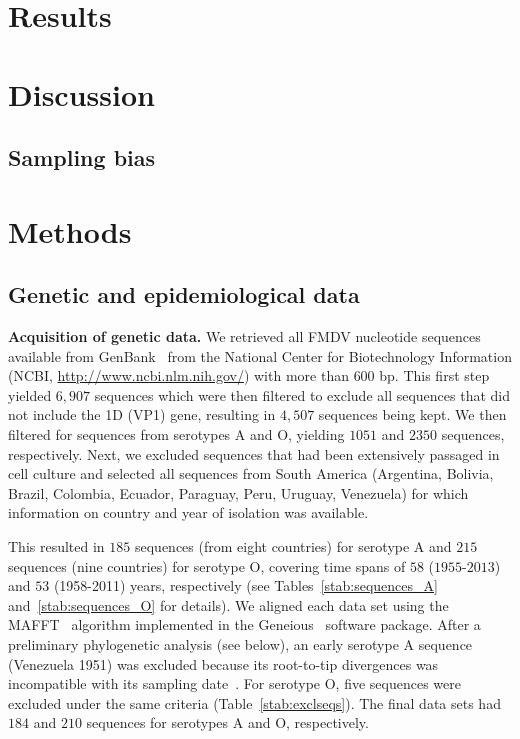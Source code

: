 \documentclass[10pt]{article}
\begin{document}
\section*{Results}

\section*{Discussion}

\subsection*{Sampling bias}

\section*{Methods}

\subsection*{Genetic and epidemiological data}

\textbf{Acquisition of genetic data.}
We retrieved all FMDV nucleotide sequences available from GenBank~\citep{Benson2013} from the National Center for Biotechnology Information (NCBI, \url{ http://www.ncbi.nlm.nih.gov/}) with more than $600$ bp.
This first step yielded $6, 907$ sequences which were then filtered to exclude all sequences that did not include the 1D (VP1) gene, resulting in $4, 507$ sequences being kept.
We then filtered for sequences from serotypes A and O, yielding $1051$ and $2350$ sequences, respectively.
Next, we excluded sequences that had been extensively passaged in cell culture and selected all sequences from South America (Argentina, Bolivia, Brazil, Colombia, Ecuador, Paraguay, Peru, Uruguay, Venezuela) for which information on country and year of isolation was available.

This resulted in $185$ sequences (from eight countries) for serotype A and $215$ sequences (nine countries) for serotype O, covering time spans of $58$ ($1955$-$2013$) and $53$ (1958-2011) years, respectively (see Tables~\ref{stab:sequences_A} and~\ref{stab:sequences_O} for details).
We aligned each data set using the MAFFT~\citep{Katoh2002} algorithm implemented in the Geneious~\citep{Kearse2012} software package.
After a preliminary phylogenetic analysis (see below), an early serotype A sequence (Venezuela 1951) was excluded because its root-to-tip divergences was incompatible with its sampling date~\citep{Rambaut2016}.
For serotype O, five sequences were excluded under the same criteria (Table~\ref{stab:exclseqs}).
The final data sets had $184$ and $210$ sequences for serotypes A and O, respectively.
\end{document}
